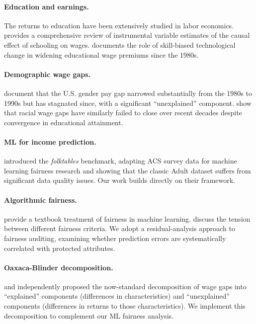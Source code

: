\documentclass[11pt]{article}
\begin{document}
\paragraph{Education and earnings.}
The returns to education have been extensively studied in labor economics.
\citet{card1999causal} provides a comprehensive review of instrumental variable
estimates of the causal effect of schooling on wages. \citet{autor2014skills}
documents the role of skill-biased technological change in widening
educational wage premiums since the 1980s.

\paragraph{Demographic wage gaps.}
\citet{blau2017gender} document that the U.S. gender pay gap narrowed
substantially from the 1980s to 1990s but has stagnated since, with a
significant ``unexplained'' component. \citet{wilson2020racial} show that
racial wage gaps have similarly failed to close over recent decades despite
convergence in educational attainment.

\paragraph{ML for income prediction.}
\citet{ding2021retiring} introduced the \textit{folktables} benchmark,
adapting ACS survey data for machine learning fairness research and showing
that the classic Adult dataset \citep{kohavi1996scaling} suffers from
significant data quality issues. Our work builds directly on their framework.

\paragraph{Algorithmic fairness.}
\citet{barocas2019fairness} provide a textbook treatment of fairness in
machine learning. \citet{corbett2023measure} discuss the tension between
different fairness criteria. We adopt a residual-analysis approach to fairness
auditing, examining whether prediction errors are systematically correlated
with protected attributes.

\paragraph{Oaxaca-Blinder decomposition.}
\citet{oaxaca1973male} and \citet{blinder1973wage} independently proposed the
now-standard decomposition of wage gaps into ``explained'' components
(differences in characteristics) and ``unexplained'' components (differences
in returns to those characteristics). We implement this decomposition to
complement our ML fairness analysis.
\end{document}
